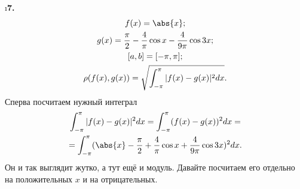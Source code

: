 \i \textbf{7.}\\
\begin{gather*}
    f(x) = \abs{x};\\
    g(x) = \frac{\pi}{2} - \frac{4}{\pi}\cos{x} - \frac{4}{9\pi}\cos{3x};\\
    [a, b] = [-\pi, \pi];\\
    \rho(f(x), g(x)) = \sqrt{\int_{-\pi}^{\pi} |f(x) - g(x)|^2dx}.
\end{gather*}
Сперва посчитаем нужный интеграл
\begin{gather*}
    \int_{-\pi}^{\pi} |f(x) - g(x)|^2dx = \int_{-\pi}^{\pi} (f(x) - g(x))^2dx = \\ = 
    \int_{-\pi}^{\pi} (\abs{x} - \frac{\pi}{2} + \frac{4}{\pi}\cos{x} + \frac{4}{9\pi}\cos{3x})^2dx.
\end{gather*}
Он и так выглядит жутко, а тут ещё и модуль. Давайте посчитаем его отдельно на положительных $x$ и на отрицательных.
